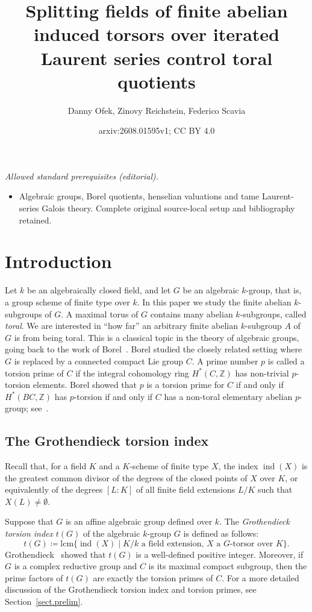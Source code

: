 \documentclass[12pt]{amsart}
\title{Splitting fields of finite abelian induced torsors over iterated Laurent series control toral quotients}
\author{Danny Ofek, Zinovy Reichstein, Federico Scavia}
\date{arxiv:2608.01595v1; CC BY 4.0}
\numberwithin{equation}{section}
\theoremstyle{remark}
\newcommand{\ind}{\operatorname{ind}}
\begin{document}
\maketitle
\noindent\textit{Allowed standard prerequisites (editorial).}\begin{itemize}
\item Algebraic groups, Borel quotients, henselian valuations and tame Laurent-series Galois theory. Complete original source-local setup and bibliography retained.
\end{itemize}\medskip
\section{Introduction} 

Let $k$ be an algebraically closed field, and let $G$ be an algebraic $k$-group, that is, a group scheme of finite type over $k$. In this paper we study the finite abelian $k$-subgroups of $G$. A maximal torus of $G$ contains many abelian $k$-subgroups, called \emph{toral}. 
We are interested in ``how far'' an arbitrary finite abelian $k$-subgroup $A$ of $G$ is from being toral. This is a classical topic in the theory of algebraic groups, going back to the work of Borel~\cite{borel-tohoku}. Borel studied the closely related setting where $G$ is replaced by a connected compact Lie group $C$. A prime number $p$ is called a torsion prime of $C$ if the integral cohomology ring $H^*(C, \mathbb Z)$ has non-trivial $p$-torsion elements. Borel showed that $p$ is a torsion prime for $C$ if and only if $H^*(BC, \mathbb Z)$ has $p$-torsion if and only if $C$ has a non-toral elementary abelian $p$-group; see~\cite[Theorem 4.5]{borel-tohoku}. 

\subsection{The Grothendieck torsion index}

Recall that, for a field $K$ and a $K$-scheme of finite type $X$, the index $\ind(X)$ is the greatest common divisor of the degrees of the closed points of $X$ over $K$, or equivalently of the degrees $[L:K]$ of all finite field extensions $L/K$ such that $X(L) \neq \emptyset$.

Suppose that $G$ is an affine algebraic group defined over $k$. The \emph{Grothendieck torsion index} $t(G)$ of the algebraic $k$-group $G$ is defined as follows: 
\begin{equation}\label{eq:t}
    t(G) \coloneqq \mathrm{lcm}\{\ind(X)\mid \text{$K/k$ a field extension, $X$ a $G$-torsor over $K$}\}.
\end{equation} 
Grothendieck~\cite{grothendieck-special} showed that $t(G)$ is a well-defined positive integer. Moreover, if $G$ is a complex reductive group and $C$ is its maximal compact subgroup, then the prime factors of $t(G)$ are exactly the torsion primes of $C$. For a more detailed discussion of the Grothendieck torsion index and torsion primes, see Section~\ref{sect.prelim}. 
\end{document}
